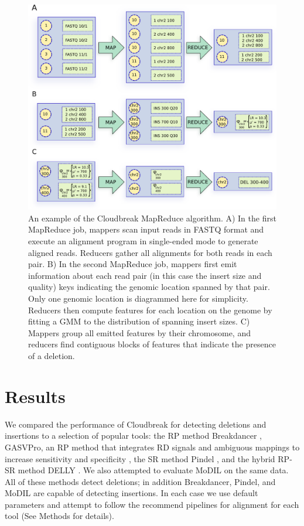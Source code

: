 \documentclass[11pt]{article}
\begin{document}
\begin{figure}
\centering
\includegraphics[width=1\textwidth]{../figures/cloudbreak_mapred_diagram.pdf}
\caption{An example of the Cloudbreak MapReduce algorithm. A) In the first MapReduce job, mappers scan input reads in FASTQ format and execute an alignment program in single-ended mode to generate aligned reads. Reducers gather all alignments for both reads in each pair. B) In the second MapReduce job, mappers first emit information about each read pair (in this case the insert size and quality) keys indicating the genomic location spanned by that pair. Only one genomic location is diagrammed here for simplicity. Reducers then compute features for each location on the genome by fitting a GMM to the distribution of spanning insert sizes. C) Mappers group all emitted features by their chromosome, and reducers find contiguous blocks of features that indicate the presence of a deletion.}
\label{algorithm_example}
\end{figure}

\section{Results}\label{results}

We compared the performance of Cloudbreak for detecting deletions and insertions to a selection of popular tools: the RP method Breakdancer \autocite{Chen:2009p3}, GASVPro, an RP method that integrates RD signals and ambiguous mappings to increase sensitivity and specificity \autocite{Sindi:2012kk}, the SR method Pindel \autocite{Ye:2009p2}, and the hybrid RP-SR method DELLY \autocite{Rausch:2012he}. We also attempted to evaluate MoDIL on the same data. All of these methods detect deletions; in addition Breakdancer, Pindel, and MoDIL are capable of detecting insertions. In each case we use default parameters and attempt to follow the recommend pipelines for alignment for each tool (See Methods for details).
\end{document}
